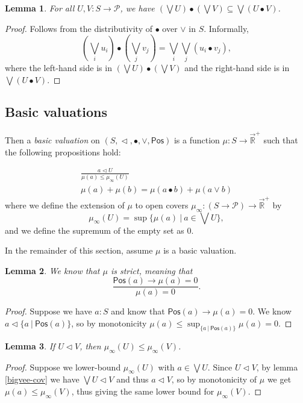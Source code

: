 \documentclass{article}           %
\newtheorem{lemma}{Lemma}
\newcommand{\R}{\mathbb{R}}
\newcommand{\lowerT}[1]{\overrightarrow{#1}}
\newcommand{\cov}{\vartriangleleft}
\newcommand{\Pos}{\mathsf{Pos}}
\newcommand{\Prop}{\mathcal{P}}
\newcommand{\suchthat}{\ |\ }
\begin{document}
\begin{lemma}
\label{bigvee-distr}
For all $U, V : S \to \Prop$, we have $(\bigvee U) \bullet (\bigvee V) \subseteq \bigvee (U \bullet V)$.
\end{lemma}
\begin{proof}
Follows from the distributivity of $\bullet$ over $\vee$ in $S$. Informally,
\[ 
(\bigvee_i u_i) \bullet (\bigvee_j v_j)
= \bigvee_i \bigvee_j (u_i \bullet v_j),
\]
where the left-hand side is in $(\bigvee U) \bullet (\bigvee V)$ and the right-hand side is in $\bigvee (U \bullet V)$.
\end{proof}

\subsection{Basic valuations}

Then a \emph{basic valuation} on $(S, \cov, \bullet, \vee, \Pos)$ is a function $\mu : S \to \lowerT{\R}^+$ such that the following propositions hold:

\begin{gather*}
\frac
{a \cov U}
{\mu(a) \le \mu_\infty(U) }
\tag{monotone}
\\
\mu(a) + \mu(b) = \mu(a \bullet b) + \mu(a \vee b)
\tag{modular}
\end{gather*}
where we define the extension of $\mu$ to open covers $\mu_\infty : (S \to \Prop) \to \lowerT{\R}^+$ by
\[
\mu_\infty(U) = \sup \{ \mu(a) \suchthat a \in \bigvee U \},
\]
and we define the supremum of the empty set as 0.

In the remainder of this section, assume $\mu$ is a basic valuation.

\begin{lemma}
We know that $\mu$ is \emph{strict}, meaning that
\[
\frac
{\Pos(a) \to \mu(a) = 0}
{\mu(a) = 0}.
\tag{strict}
\]
\end{lemma}
\begin{proof}
Suppose we have $a : S$ and know that $\Pos(a) \to \mu(a) = 0$. We know $a \cov \{ a \suchthat \Pos(a) \}$, so by monotonicity $\mu(a) \le \sup_{\{a \suchthat \Pos(a)\}} \mu(a) = 0$.
\end{proof}

\begin{lemma}
If $U \cov V$, then $\mu_\infty(U) \le \mu_\infty(V)$.
\end{lemma}
\begin{proof}
Suppose we lower-bound $\mu_\infty(U)$ with $a \in \bigvee U$. Since $U \cov V$, by lemma \ref{bigvee-cov} we have $\bigvee U \cov V$ and thus $a \cov V$, so by monotonicity of $\mu$ we get $\mu(a) \le \mu_\infty(V)$, thus giving the same lower bound for $\mu_\infty(V)$.
\end{proof}
\end{document}
